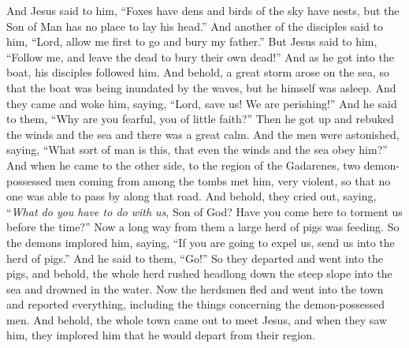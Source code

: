 \begin{biblechapter}
\verse And Jesus said to him, “Foxes have dens and birds of the sky have nests, but the Son of Man has no place to lay his head.”
\verse And another of the disciples said to him, “Lord, allow me first to go and bury my father.”
\verse But Jesus said to him, “Follow me, and leave the dead to bury their own dead!”
 And as he got into the boat, his disciples followed him.
\verse And behold, a great storm arose on the sea, so that the boat was being inundated by the waves, but he himself was asleep.
\verse And they came and woke him, saying, “Lord, save us! We are perishing!”
\verse And he said to them, “Why are you fearful, you of little faith?” Then he got up and rebuked the winds and the sea and there was a great calm.
\verse And the men were astonished, saying, “What sort of man is this, that even the winds and the sea obey him?”
 And when he came to the other side, to the region of the Gadarenes, two demon-possessed men coming from among the tombs met him, very violent, so that no one was able to pass by along that road.
\verse And behold, they cried out, saying, “\textit{What do you have to do with us}, Son of God? Have you come here to torment us before the time?”
\verse Now a long way from them a large herd of pigs was feeding.
\verse So the demons implored him, saying, “If you are going to expel us, send us into the herd of pigs.”
\verse And he said to them, “Go!” So they departed and went into the pigs, and behold, the whole herd rushed headlong down the steep slope into the sea and drowned in the water.
\verse Now the herdsmen fled and went into the town and reported everything, including the things concerning the demon-possessed men.
\verse And behold, the whole town came out to meet Jesus, and when they saw him, they implored him that he would depart from their region.
\end{biblechapter}

